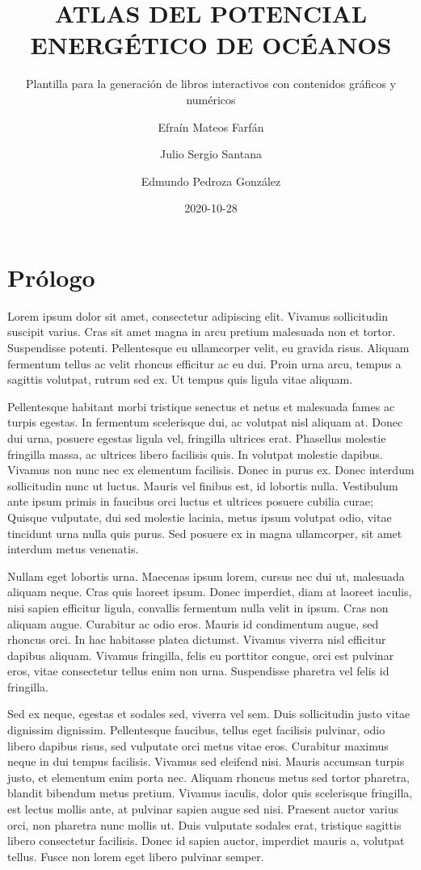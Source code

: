 \documentclass[
]{article}
\title{ATLAS DEL POTENCIAL ENERGÉTICO DE OCÉANOS}
\subtitle{Plantilla para la generación de libros interactivos con contenidos gráficos y numéricos}
\author{Efraín Mateos Farfán \and Julio Sergio Santana \and Edmundo Pedroza González}
\date{2020-10-28}
\begin{document}
\maketitle

{
\setcounter{tocdepth}{2}
\tableofcontents
}
\hypertarget{pruxf3logo}{%
\section{Prólogo}\label{pruxf3logo}}

Lorem ipsum dolor sit amet, consectetur adipiscing elit. Vivamus sollicitudin suscipit varius. Cras sit amet magna in arcu pretium malesuada non et tortor. Suspendisse potenti. Pellentesque eu ullamcorper velit, eu gravida risus. Aliquam fermentum tellus ac velit rhoncus efficitur ac eu dui. Proin urna arcu, tempus a sagittis volutpat, rutrum sed ex. Ut tempus quis ligula vitae aliquam.

Pellentesque habitant morbi tristique senectus et netus et malesuada fames ac turpis egestas. In fermentum scelerisque dui, ac volutpat nisl aliquam at. Donec dui urna, posuere egestas ligula vel, fringilla ultrices erat. Phasellus molestie fringilla massa, ac ultrices libero facilisis quis. In volutpat molestie dapibus. Vivamus non nunc nec ex elementum facilisis. Donec in purus ex. Donec interdum sollicitudin nunc ut luctus. Mauris vel finibus est, id lobortis nulla. Vestibulum ante ipsum primis in faucibus orci luctus et ultrices posuere cubilia curae; Quisque vulputate, dui sed molestie lacinia, metus ipsum volutpat odio, vitae tincidunt urna nulla quis purus. Sed posuere ex in magna ullamcorper, sit amet interdum metus venenatis.

Nullam eget lobortis urna. Maecenas ipsum lorem, cursus nec dui ut, malesuada aliquam neque. Cras quis laoreet ipsum. Donec imperdiet, diam at laoreet iaculis, nisi sapien efficitur ligula, convallis fermentum nulla velit in ipsum. Cras non aliquam augue. Curabitur ac odio eros. Mauris id condimentum augue, sed rhoncus orci. In hac habitasse platea dictumst. Vivamus viverra nisl efficitur dapibus aliquam. Vivamus fringilla, felis eu porttitor congue, orci est pulvinar eros, vitae consectetur tellus enim non urna. Suspendisse pharetra vel felis id fringilla.

Sed ex neque, egestas et sodales sed, viverra vel sem. Duis sollicitudin justo vitae dignissim dignissim. Pellentesque faucibus, tellus eget facilisis pulvinar, odio libero dapibus risus, sed vulputate orci metus vitae eros. Curabitur maximus neque in dui tempus facilisis. Vivamus sed eleifend nisi. Mauris accumsan turpis justo, et elementum enim porta nec. Aliquam rhoncus metus sed tortor pharetra, blandit bibendum metus pretium. Vivamus iaculis, dolor quis scelerisque fringilla, est lectus mollis ante, at pulvinar sapien augue sed nisi. Praesent auctor varius orci, non pharetra nunc mollis ut. Duis vulputate sodales erat, tristique sagittis libero consectetur facilisis. Donec id sapien auctor, imperdiet mauris a, volutpat tellus. Fusce non lorem eget libero pulvinar semper.
\end{document}
